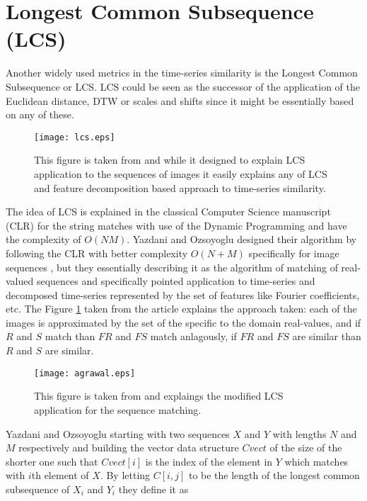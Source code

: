 \section{Longest Common Subsequence (LCS) } \label{lcs}
Another widely used metrics in the time-series similarity is the Longest Common Subsequence or LCS. LCS could be seen as the successor of the application of the Euclidean distance, DTW or scales and shifts \cite{citeulike:3816327} since it might be essentially based on any of these. 
\begin{figure}[tbp]
   \centering
   \texttt{[image: lcs.eps]}
   \caption{This figure is taken from \cite{citeulike:4367061} and while it designed to explain LCS application to the sequences of images it easily explains any of LCS and feature decomposition based approach to time-series similarity.}
   \label{fig:lcs}
\end{figure} 
The idea of LCS is explained in the classical Computer Science manuscript \cite{citeulike:180287} (CLR) for the string matches with use of the Dynamic Programming and have the complexity of $O(NM)$. Yazdani and Ozsoyoglu designed their algorithm by following the CLR with better complexity $O(N+M)$ specifically for image sequences \cite{citeulike:4367061}, but they essentially describing it as the algorithm of matching of real-valued sequences and specifically pointed application to time-series and decomposed time-series represented by the set of features like Fourier coefficients, etc. The Figure \ref{fig:lcs} taken from the article explains the approach taken: each of the images is approximated by the set of the specific to the domain real-values, and if $R$ and $S$ match than $FR$ and $FS$ match anlagously, if $FR$ and $FS$ are similar than $R$ and $S$ are similar.

\begin{figure}[tbp]
   \centering
   \texttt{[image: agrawal.eps]}
   \caption{This figure is taken from \cite{citeulike:3816327} and explaings the modified LCS application for the sequence matching.}
   \label{fig:agrawal_lcs}
\end{figure} 

Yazdani and Ozsoyoglu starting with two sequences $X$ and $Y$ with lengths $N$ and $M$ respectively and building the vector data structure $Cvect$ of the size of the shorter one such that $Cvect[i]$ is the index of the element in $Y$ which matches with $i$th element of $X$. By letting $C[i,j]$ to be the length of the longest common subsequence of $X_{i}$ and $Y_{i}$ they define it as 

